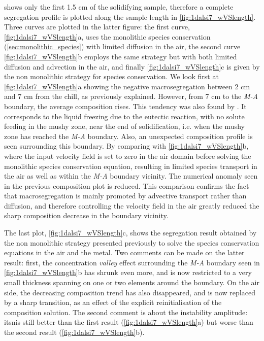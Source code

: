  shows only the first 1.5 cm of the solidifying sample, therefore a complete segregation profile is plotted along the sample length in \cref{fig:1dalsi7_wVSlength}.
Three curves are plotted in the latter figure: the first curve, \cref{fig:1dalsi7_wVSlength}a, uses the monolithic species conservation (\cref{sec:monolithic_species})
with limited diffusion in the air, the second curve \cref{fig:1dalsi7_wVSlength}b employs the same strategy but with both limited diffusion and advection in the air, and
finally \cref{fig:1dalsi7_wVSlength}c is given by the non monolithic strategy for species conservation.
We look first at \cref{fig:1dalsi7_wVSlength}a showing the negative macrosegregation between 2 cm and 7 cm from the chill, as previously explained.
However, from 7 cm to the \emph{M-A} boundary, the average composition rises.
This tendency was also found by \citet{niane_etude_2004}. It corresponds to the liquid freezing due to the eutectic reaction, with no solute feeding in the mushy zone, 
near the end of solidification, i.e. when the mushy zone has reached the \emph{M-A} boundary.
Also, an unexpected composition profile is seen surrounding this boundary. 
By comparing with \cref{fig:1dalsi7_wVSlength}b, where the input velocity field is set to zero in the air domain before solving the monolithic species conservation equation,
resulting in limited species transport in the air as well as within the \emph{M-A} boundary vicinity. The numerical anomaly seen in the previous composition plot is reduced.
This comparison confirms the fact that macrosegregation is mainly promoted by advective transport rather than diffusion, and therefore controlling the velocity field in the air greatly reduced the sharp
composition decrease in the boundary vicinity.

The last plot, \cref{fig:1dalsi7_wVSlength}c, shows the segregation result obtained by the non monolithic strategy presented previously to solve the species conservation equations
in the air and the metal. Two comments can be made on the latter result: first, the concentration \emph{valley} effect surrounding the \emph{M-A} boundary seen in 
\cref{fig:1dalsi7_wVSlength}b has shrunk even more, and is now restricted to a very small thickness spanning on one or two elements around the boundary.
On the air side, the decreasing composition trend has also disappeared, and is now replaced by a sharp transition, as an effect of the explicit reinitialisation of 
the composition solution. The second comment is about the instability amplitude: itsnis still better than the first result (\cref{fig:1dalsi7_wVSlength}a) 
but worse than the second result (\cref{fig:1dalsi7_wVSlength}b).

